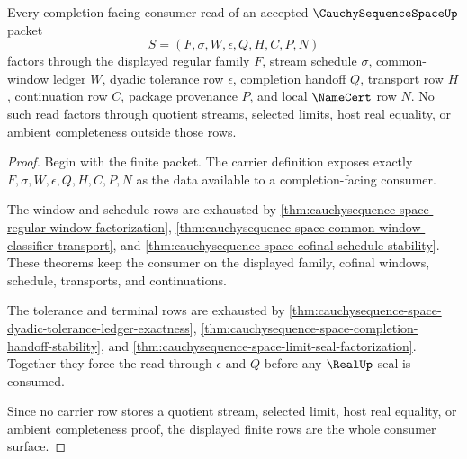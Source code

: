 \begin{theorem}
\label{thm:cauchysequence-space-regular-family-exhaustion}
Every completion-facing consumer read of an accepted $\CauchySequenceSpaceUp$ packet
$$
S=(F,\sigma,W,\epsilon,Q,H,C,P,N)
$$
factors through the displayed regular family $F$, stream schedule $\sigma$, common-window ledger $W$, dyadic tolerance row $\epsilon$, completion handoff $Q$, transport row $H$, continuation row $C$, package provenance $P$, and local $\NameCert$ row $N$. No such read factors through quotient streams, selected limits, host real equality, or ambient completeness outside those rows.
\end{theorem}
\begin{proof}
Begin with the finite packet. The carrier definition exposes exactly $F,\sigma,W,\epsilon,Q,H,C,P,N$ as the data available to a completion-facing consumer.

The window and schedule rows are exhausted by \autoref{thm:cauchysequence-space-regular-window-factorization}, \autoref{thm:cauchysequence-space-common-window-classifier-transport}, and \autoref{thm:cauchysequence-space-cofinal-schedule-stability}. These theorems keep the consumer on the displayed family, cofinal windows, schedule, transports, and continuations.

The tolerance and terminal rows are exhausted by \autoref{thm:cauchysequence-space-dyadic-tolerance-ledger-exactness}, \autoref{thm:cauchysequence-space-completion-handoff-stability}, and \autoref{thm:cauchysequence-space-limit-seal-factorization}. Together they force the read through $\epsilon$ and $Q$ before any $\RealUp$ seal is consumed.

Since no carrier row stores a quotient stream, selected limit, host real equality, or ambient completeness proof, the displayed finite rows are the whole consumer surface.
\end{proof}

